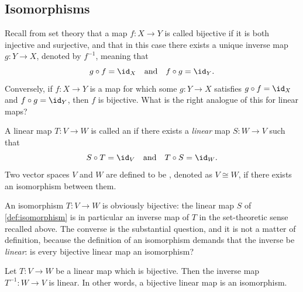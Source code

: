 \subsection{Isomorphisms}

Recall from set theory that a map $f: X \to Y$ is called bijective if it is both injective and surjective, and that in this case there exists a unique inverse map $g: Y \to X$, denoted by $f^{-1}$, meaning that
\[
g \circ f = \id_X \quad \text{and} \quad f \circ g = \id_Y.
\]
Conversely, if $f: X \to Y$ is a map for which some $g: Y \to X$ satisfies $g \circ f = \id_X$ and $f \circ g = \id_Y$, then $f$ is bijective. What is the right analogue of this for linear maps?

\begin{definition}[Isomorphism]
\label{def:isomorphism}
A linear map $T: V \to W$ is called an  if there exists a \emph{linear} map $S: W \to V$ such that
\[
S \circ T = \id_V \quad \text{and} \quad T \circ S = \id_W.
\]
Two vector spaces $V$ and $W$ are defined to be , denoted as $V \cong W$, if there exists an isomorphism between them.

\begin{center}
\end{center}

\end{definition}

\begin{remark}
\label{rem:iso_is_bijective}
An isomorphism $T: V \to W$ is obviously bijective: the linear map $S$ of \cref{def:isomorphism} is in particular an inverse map of $T$ in the set-theoretic sense recalled above. The converse is the substantial question, and it is not a matter of definition, because the definition of an isomorphism demands that the inverse be \emph{linear}: is every bijective linear map an isomorphism?
\end{remark}

\begin{lemma}
\label{lem:bijective_is_iso}
Let $T: V \to W$ be a linear map which is bijective. Then the inverse map $T^{-1}: W \to V$ is linear. In other words, a bijective linear map is an isomorphism.
\end{lemma}

